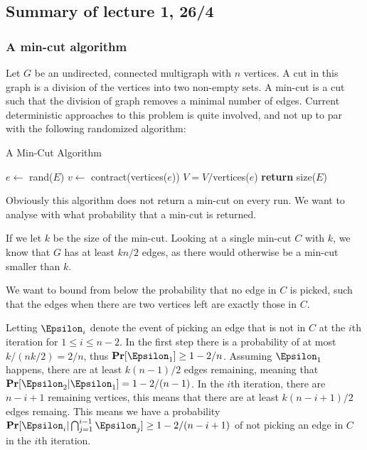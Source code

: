 \documentclass[a4paper]{article}
\def\Pr{\mbox{\textbf{Pr}}}
\begin{document}
\subsection{Summary of lecture 1, 26/4}
\subsubsection{A min-cut algorithm}
Let $G$ be an undirected, connected multigraph with $n$ vertices. A cut in this graph is a division of the vertices into two non-empty sets. A min-cut is a cut such that the division of graph removes a minimal number of edges. Current deterministic approaches to this problem is quite involved, and not up to par with the following randomized algorithm:

\begin{algorithm}
  \caption{A Min-Cut Algorithm}
  \begin{algorithmic}
        \State $e \gets $ rand($E$) 
        \State $v \gets $ contract(vertices($e$)) 
        \State $V = V / $vertices($e$)
      \EndWhile
      \State \textbf{return} size($E$)
    \EndProcedure
  \end{algorithmic}
\end{algorithm}

Obviously this algorithm does not return a min-cut on every run. We want to analyse with what probability that a min-cut is returned.

If we let $k$ be the size of the min-cut. Looking at a single min-cut $C$ with $k$, we know that $G$ has at least $kn/2$ edges, as there would otherwise be a min-cut smaller than $k$.

We want to bound from below the probability that no edge in $C$ is picked, such that the edges when there are two vertices left are exactly those in $C$.

Letting $\Epsilon_i$ denote the event of picking an edge that is not in $C$ at the $i$th iteration for $1 \leq i \leq n-2$. In the first step there is a probability of at most $k/(nk/2) = 2/n$, thus $\Pr [\Epsilon_1] \geq 1 - 2/n$. Assuming $\Epsilon_1$ happens, there are at least $k(n-1)/2$ edges remaining, meaning that $\Pr [\Epsilon_2 | \Epsilon_1] = 1 - 2/(n-1)$. In the $i$th iteration, there are $n-i+1$ remaining vertices, this means that there are at least $k(n-i+1)/2$ edges remaing. This means we have a probability $\Pr[\Epsilon_i | \bigcap_{j=1}^{i-1} \Epsilon_j] \geq 1 -2/(n-i + 1)$ of not picking an edge in $C$ in the $i$th iteration.
\end{document}
